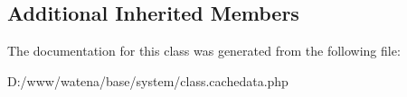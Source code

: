 \subsection*{Additional Inherited Members}


The documentation for this class was generated from the following file\-:\begin{DoxyCompactItemize}
\item 
D\-:/www/watena/base/system/class.\-cachedata.\-php\end{DoxyCompactItemize}

